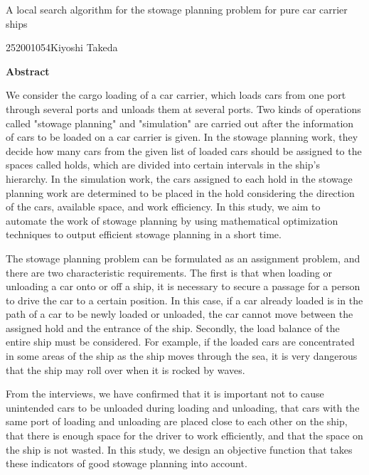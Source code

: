 \newpage
\begin{center}{\LARGE A local search algorithm for the stowage planning problem for pure car carrier ships }\\[0.5cm]
\end{center}
\hfill {\large 252001054\qquad Kiyoshi Takeda}\\[0.5cm]
\begin{center}
{\large \bf Abstract}\\
\end{center}

We consider the cargo loading of a car carrier, which loads cars from one port through several ports and unloads them at several ports.
Two kinds of operations called "stowage planning" and "simulation" are carried out after the information of cars to be loaded on a car carrier is given.
In the stowage planning work, they decide how many cars from the given list of loaded cars should be assigned to the spaces called holds, which are divided into certain intervals in the ship's hierarchy.
In the simulation work, the cars assigned to each hold in the stowage planning work are determined to be placed in the hold considering the direction of the cars, available space, and work efficiency.
In this study, we aim to automate the work of stowage planning by using mathematical optimization techniques to output efficient stowage planning in a short time.

The stowage planning problem can be formulated as an assignment problem, and there are two characteristic requirements.
The first is that when loading or unloading a car onto or off a ship, it is necessary to secure a passage for a person to drive the car to a certain position.
In this case, if a car already loaded is in the path of a car to be newly loaded or unloaded, the car cannot move between the assigned hold and the entrance of the ship.
Secondly, the load balance of the entire ship must be considered.
For example, if the loaded cars are concentrated in some areas of the ship as the ship moves through the sea, it is very dangerous that the ship may roll over when it is rocked by waves.

From the interviews, we have confirmed that it is important not to cause unintended cars to be unloaded during loading and unloading, that cars with the same port of loading and unloading are placed close to each other on the ship, that there is enough space for the driver to work efficiently, and that the space on the ship is not wasted. In this study, we design an objective function that takes these indicators of good stowage planning into account.

